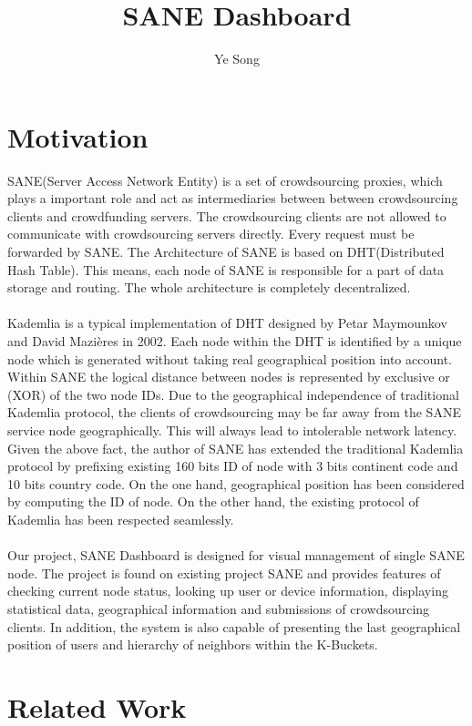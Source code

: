 \documentclass[12pt,oneside,a4paper]{article}
\begin{document}
\title{\huge SANE Dashboard}
\author{Ye Song}
\maketitle
\thispagestyle{empty}

\section{\LARGE Motivation}
SANE(Server Access Network Entity) is a set of crowdsourcing proxies, which plays a important role and act as intermediaries between between crowdsourcing clients and crowdfunding servers. The crowdsourcing clients are not allowed to communicate with crowdsourcing servers directly. Every request must be forwarded by SANE. The Architecture of SANE is based on DHT(Distributed Hash Table). This means, each node of SANE is responsible for a part of data storage and routing.  The whole architecture is completely decentralized.\\\\
Kademlia is a typical implementation of DHT designed by Petar Maymounkov and David Mazières in 2002. Each node within the DHT is identified by a unique node which is generated without taking real geographical position into account.  Within SANE the logical distance between nodes is represented by exclusive or (XOR) of the two node IDs. Due to the geographical independence of traditional Kademlia protocol, the clients of crowdsourcing may be far away from the SANE service node geographically. This will always lead to intolerable network latency. Given the above fact, the author of SANE has extended the traditional Kademlia protocol by prefixing existing 160 bits ID of node with 3 bits continent code and 10 bits country code. On the one hand, geographical position has been considered by computing the ID of node. On the other hand, the existing protocol of Kademlia has been respected seamlessly.\\\\
Our project, SANE Dashboard is designed for visual management of single SANE node. The project is found on existing project SANE and provides features of checking current node status, looking up user or device information, displaying statistical data, geographical information and submissions of crowdsourcing clients. In addition, the system is also capable of presenting the last geographical position of users and hierarchy of neighbors within the K-Buckets.

\section{\LARGE Related Work}
\end{document}
